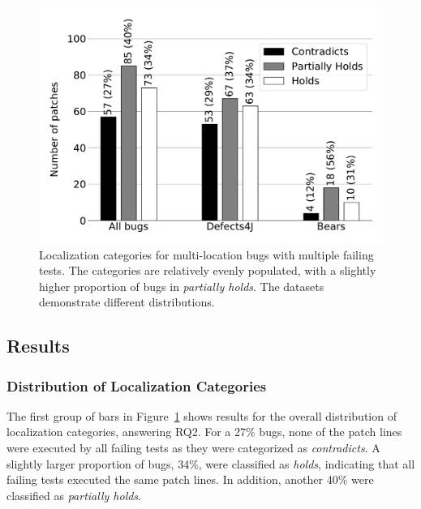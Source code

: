 \documentclass[10pt, conference]{IEEEtran}
\begin{document}
\begin{figure}
	\includegraphics[width=\linewidth]{img/coverage_hist_all.pdf}
	\caption{\small Localization categories for multi-location bugs with multiple failing
      tests. The categories are relatively 
      evenly populated, with a slightly higher proportion of bugs in
      \emph{partially holds}. The datasets demonstrate different distributions.}
	\label{fig:coverage-all}
\end{figure}

\subsection{Results}

\subsubsection{Distribution of Localization Categories} \label{sec:cov_patterns}

The first group of bars in Figure~\ref{fig:coverage-all} shows results for the overall distribution 
of localization categories, 
answering RQ2. 
For a 27\% bugs, none of the patch lines were executed by all failing tests as they were 
categorized as \emph{contradicts}.  A slightly larger proportion of bugs, 34\%, were classified 
as 
\emph{holds}, indicating that all failing tests executed the same patch lines.
In addition, another 40\% were classified as \emph{partially holds}.
\end{document}
